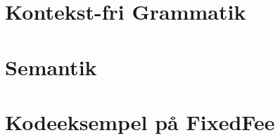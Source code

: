 \appendix

\chapter{Kontekst-fri Grammatik}
\label{bil:cfg}


\label{FIRSTAPPENDIX} %

\chapter{Semantik}
\label{bil:semantik}


\chapter{Kodeeksempel på FixedFee}
\label{bil:fixedfee}


\label{LASTAPPENDIX}



%

%


%

%